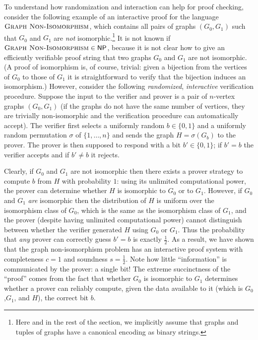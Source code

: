 \documentclass[11pt]{article}
\theoremstyle{definition}
\newcommand{\GNI}{\textsc{Graph Non-Isomorphism}}
\newcommand{\class}[1]{\ensuremath{\mathsf{#1}}\xspace}
\newcommand{\NP}{\class{NP}} %
\begin{document}

To understand how randomization and interaction can help for proof checking, consider the following example of an interactive proof for the language $\GNI$, which contains all pairs of graphs $(G_0,G_1)$ such that $G_0$ and $G_1$ are \emph{not} isomorphic.\footnote{Here and in the rest of the section, we implicitly assume that graphs and tuples of graphs have a canonical encoding as binary strings.}
It is not known if $\GNI\in \NP$, because it is not clear how to give an efficiently verifiable proof string that two graphs $G_0$ and $G_1$ are not isomorphic. (A proof of isomorphism is, of course, trivial: given a bijection from the vertices of $G_0$ to those of $G_1$ it is straightforward to verify that the bijection induces an isomorphism.) However, consider the following \emph{randomized}, \emph{interactive} verification procedure. Suppose the input to the verifier and prover is a pair of $n$-vertex graphs $(G_0,G_1)$ (if the graphs do not have the same number of vertices, they are trivially non-isomorphic and the verification procedure can automatically accept). The verifier first selects a uniformly random $b\in \{0,1\}$ and a uniformly random permutation $\sigma$ of $\{1,\ldots,n\}$ and sends the graph $H = \sigma( G_b)$ to the prover. The prover is then supposed to respond with a bit $b'\in \{0,1\}$; if $b'=b$  the verifier accepts and if $b'\neq b$ it rejects. 

Clearly, if $G_0$ and $G_1$ are not isomorphic then there exists a prover {strategy} to compute $b$ from $H$ with probability $1$: using its unlimited computational power, the prover can determine whether $H$ is isomorphic to $G_0$ or to $G_1$. However, if $G_0$ and $G_1$ \emph{are} isomorphic then the distribution of $H$ is uniform over the isomorphism class of $G_0$, which is the same as the isomorphism class of $G_1$, and the prover (despite having unlimited computational power) cannot distinguish between whether the verifier generated $H$ using $G_0$ or $G_1$. Thus the probability that \emph{any} prover can correctly guess $b'=b$ is exactly $\frac{1}{2}$. As a result, we have shown that the graph non-isomorphism problem has an interactive proof system with completeness $c=1$ and soundness $s=\frac{1}{2}$. Note how little ``information'' is communicated by the prover: a single bit!
The extreme succinctness of the ``proof'' comes from the fact that whether $G_0$ is isomorphic to $G_1$ determines whether a prover can reliably compute, given the data available to it (which is $G_0$,$G_1$, and $H$), the correct bit $b$.
\end{document}
